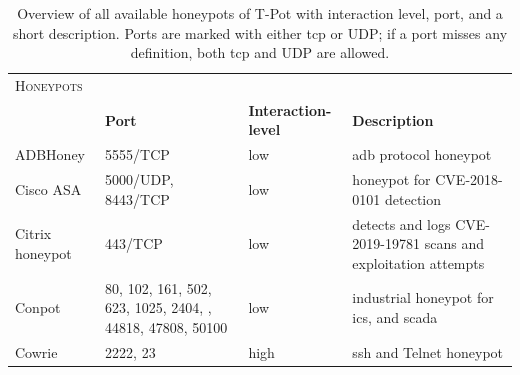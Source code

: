 \begin{table}
    \centering
    \caption[Overview of honeypots of T-Pot]{
        Overview of all available honeypots of T-Pot with interaction level, port, and a short description.
        Ports are marked with either \ac{tcp} or UDP; if a port misses any definition, both \ac{tcp} and UDP are allowed.
    }
    \begin{tabularx}{\linewidth}{l|XlX}
        \toprule
        \textsc{Honeypots}                        & \multicolumn{3}{c}{}                                                                                                                                                                                                            \\
                                                  & \textbf{Port}                                                                                               & \textbf{Interaction-level} & \textbf{Description}                                                                 \\
        \hline
        ADBHoney \cite{adbhoney2021}              & 5555/TCP                                                                                                    & low                        & \ac{adb} protocol honeypot                                                           \\
        Cisco ASA \cite{cymmetria2018}            & 5000/UDP, 8443/TCP                                                                                          & low                        & honeypot for CVE-2018-0101\cite{CVE-2018-0101} detection                             \\
        Citrix honeypot \cite{citrixhoneypot2020} & 443/TCP                                                                                                     & low                        & detects and logs CVE-2019-19781\cite{CVE-2019-19781} scans and exploitation attempts \\
        Conpot \cite{conpot2021}                  & 80, 102, 161, 502, 623, 1025, 2404, \newline 10001, 44818, 47808, 50100                                     & low                        & industrial honeypot for \ac{ics}, and \ac{scada}                                     \\
        Cowrie \cite{cowrie2021}                  & 2222, 23                                                                                                    & high                       & \ac{ssh} and Telnet honeypot                                                              \\

\end{tabularx}
\end{table}
